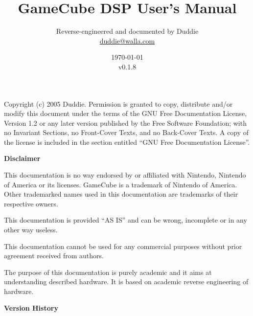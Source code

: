 \documentclass[oneside,english,a4paper,10pt,oneside,openany,final]{memoir}
\title{\textbf{\Huge GameCube DSP User's Manual}}
\author{Reverse-engineered and documented by Duddie \\ \href{mailto:duddie@walla.com}{duddie@walla.com}}
\date{\today\\v0.1.8}
\begin{document}
\maketitle{}

\pagebreak{}
\vspace*{\fill}

Copyright (c) 2005 Duddie. Permission is granted to copy, distribute and/or modify this document under the terms of the GNU Free Documentation License, Version 1.2 or any later version published by the Free Software Foundation; with no Invariant Sections, no Front-Cover Texts, and no Back-Cover Texts. A copy of the license is included in the section entitled ``GNU Free Documentation License''.

\pagebreak{}
\tableofcontents{}
\pagebreak{}

\textbf{\LARGE Disclaimer}
\vspace{5mm}

This documentation is no way endorsed by or affiliated with Nintendo, Nintendo of America or its licenses. GameCube is a trademark of Nintendo of America. Other trademarked names used in this documentation are trademarks of their respective owners.

This documentation is provided ``AS IS'' and can be wrong, incomplete or in any other way useless.

This documentation cannot be used for any commercial purposes without prior agreement received from authors.

The purpose of this documentation is purely academic and it aims at understanding described hardware. It is based on academic reverse engineering of hardware.

\pagebreak{}
\textbf{\LARGE Version History}
\vspace{5mm}
\end{document}
